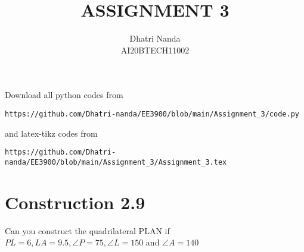 \documentclass[journal,12pt,twocolumn]{IEEEtran}
\begin{document}
     \def\centbox#1{\makebox[0in]{#1}}
     \def\topbox#1{\raisebox{-\baselineskip}[0in][0in]{#1}}
     \def\midbox#1{\raisebox{-0.5\baselineskip}[0in][0in]{#1}}
\vspace{3cm}
\title{ASSIGNMENT 3}
\author{Dhatri Nanda \\ AI20BTECH11002}
\maketitle
\newpage
\bigskip
\renewcommand{\thefigure}{\theenumi}
\renewcommand{\thetable}{\theenumi}
Download all python codes from 
\begin{lstlisting}
https://github.com/Dhatri-nanda/EE3900/blob/main/Assignment_3/code.py
\end{lstlisting}
%
and latex-tikz codes from 
%
\begin{lstlisting}
https://github.com/Dhatri-nanda/EE3900/blob/main/Assignment_3/Assignment_3.tex
\end{lstlisting}
\section{Construction 2.9}
Can you construct the quadrilateral PLAN if $PL = 6, LA = 9.5, \angle P = 75, \angle L = 150$ and $ \angle A = 140$ 
%
\end{document}
